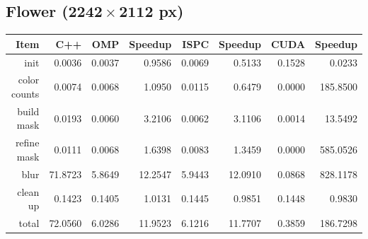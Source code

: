 \documentclass[12pt]{article}
\begin{document}
\subsection{Flower ($\mathbf{2242 \times 2112}$ px)}

\begin{tabular}{r|r|r|r|r|r|r|r}
    Item & C++ & OMP & Speedup & ISPC & Speedup & CUDA & Speedup
\\  \hline
    init & 0.0036 & 0.0037 & 0.9586 & 0.0069 & 0.5133 & 0.1528 & 0.0233
\\  color counts & 0.0074 & 0.0068 & 1.0950 & 0.0115 & 0.6479 & 0.0000 & 185.8500
\\  build mask & 0.0193 & 0.0060 & 3.2106 & 0.0062 & 3.1106 & 0.0014 & 13.5492
\\  refine mask & 0.0111 & 0.0068 & 1.6398 & 0.0083 & 1.3459 & 0.0000 & 585.0526
\\  blur & 71.8723 & 5.8649 & 12.2547 & 5.9443 & 12.0910 & 0.0868 & 828.1178
\\  clean up & 0.1423 & 0.1405 & 1.0131 & 0.1445 & 0.9851 & 0.1448 & 0.9830
\\  \hline
    total & 72.0560 & 6.0286 & 11.9523 & 6.1216 & 11.7707 & 0.3859 & 186.7298
\end{tabular}
\end{document}
